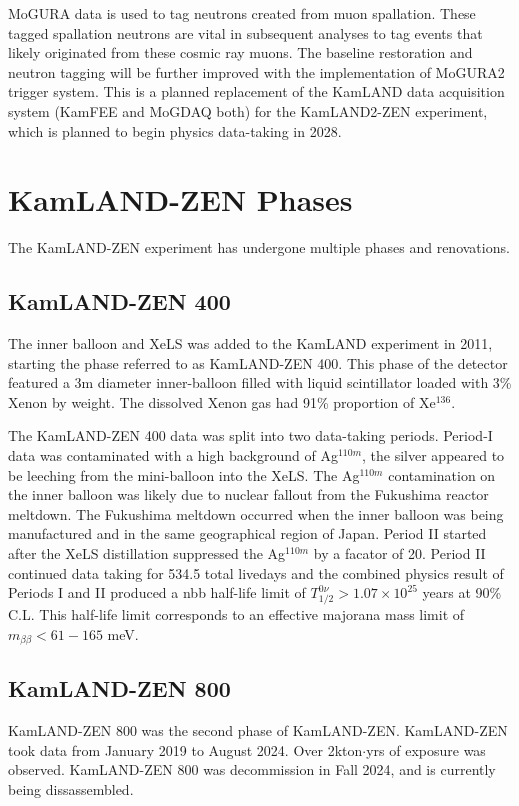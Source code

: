 MoGURA data is used to tag neutrons created from muon spallation. These tagged spallation neutrons are vital in subsequent analyses to tag events that likely originated from these cosmic ray muons. The baseline restoration and neutron tagging will be further improved with the implementation of MoGURA2 trigger system. This is a planned replacement of the KamLAND data acquisition system (KamFEE and MoGDAQ both) for the KamLAND2-ZEN experiment, which is planned to begin physics data-taking in 2028.

\section{KamLAND-ZEN Phases}
The KamLAND-ZEN experiment has undergone multiple phases and renovations.
\subsection{KamLAND-ZEN 400}
The inner balloon and XeLS was added to the KamLAND experiment in 2011, starting the phase referred to as KamLAND-ZEN 400. This phase of the detector featured a 3m diameter inner-balloon filled with liquid scintillator loaded with 3\% Xenon by weight. The dissolved Xenon gas had 91\% proportion of Xe$^{136}$.

The KamLAND-ZEN 400 data was split into two data-taking periods. Period-I data was contaminated with a high background of Ag$^{110m}$, the silver appeared to be leeching from the mini-balloon into the XeLS. The Ag$^{110m}$ contamination on the inner balloon was likely due to nuclear fallout from the Fukushima reactor meltdown. The Fukushima meltdown occurred when the inner balloon was being manufactured and in the same geographical region of Japan. Period II started after the XeLS distillation suppressed the Ag$^{110m}$ by a facator of 20. Period II continued data taking for 534.5 total livedays and the combined physics result of Periods I and II produced a \0nbb half-life limit of $T_{1/2}^{0\nu}>1.07\times 10^{25}$ years at 90\% C.L. This half-life limit corresponds to an effective majorana mass limit of $m_{\beta\beta} < 61-165$ meV. 

\subsection{KamLAND-ZEN 800}
KamLAND-ZEN 800 was the second phase of KamLAND-ZEN. KamLAND-ZEN took data from January 2019 to August 2024. Over 2kton$\cdot$yrs of exposure was observed. KamLAND-ZEN 800 was decommission in Fall 2024, and is currently being dissassembled. \\
